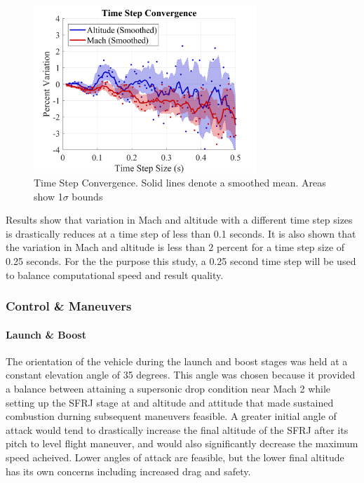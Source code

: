 \begin{figure}[H]
\centering
\includegraphics[width=0.75\textwidth]{ModelingAndSim/figures/timeStepConvergence.png}
\caption{Time Step Convergence. Solid lines denote a smoothed mean. Areas show 1$\sigma$ bounds}
\label{fig:timeStepConvergence}
\end{figure}

Results show that variation in Mach and altitude with a different time step sizes is drastically reduces at a time step of less than 0.1 seconds. It is also shown that the variation in Mach and altitude is less than 2 percent for a time step size of 0.25 seconds. For the the purpose this study, a 0.25 second time step will be used to balance computational speed and result quality.

\subsubsection{Control \& Maneuvers}

\paragraph{Launch \& Boost} The orientation of the vehicle during the launch and boost stages was held at a constant elevation angle of 35 degrees. This angle was chosen because it provided a balance between attaining a supersonic drop condition near Mach 2 while setting up the SFRJ stage at and altitude and attitude that made sustained combustion durning subsequent maneuvers feasible. A greater initial angle of attack would tend to drastically increase the final altitude of the SFRJ after its pitch to level flight maneuver, and would also significantly decrease the maximum speed acheived. Lower angles of attack are feasible, but the lower final altitude has its own concerns including increased drag and safety. 

